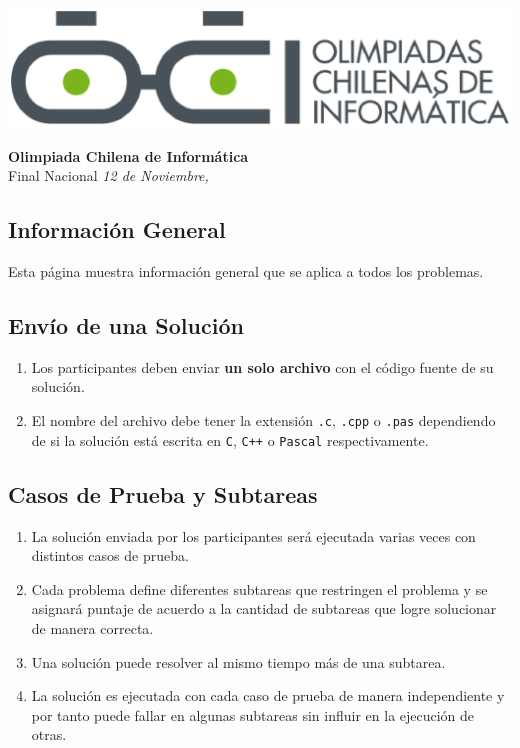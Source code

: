 \documentclass[12pt]{oci}
\begin{document}
\begin{titlingpage}
  \begin{center}
  \includegraphics[scale=0.6]{logo.eps}

  \vskip 70pt
  \Large{\bf Olimpiada Chilena de Inform\'atica\\ \the\year}
  \vskip 10pt
  \large{Final Nacional}
  \vskip 10pt
  \normalsize{\it 12 de Noviembre, \the\year}


  \vskip 95pt

  \end{center}
\end{titlingpage}


\subsection*{Informaci\'on General}

Esta p\'agina muestra informaci\'on general que se aplica a todos los problemas.

\subsection*{Env\'io de una Soluci\'on}


\begin{enumerate}
\itemsep 0em
\item Los participantes deben enviar {\bf un solo archivo} con el c\'odigo fuente de su soluci\'on.
\item El nombre del archivo debe tener la extensi\'on \verb+.c+, \verb+.cpp+ o \verb+.pas+ dependiendo de si la soluci\'on est\'a escrita en \verb|C|, \verb|C++| o \verb|Pascal| respectivamente.
\end{enumerate}

\subsection*{Casos de Prueba y Subtareas}
\begin{enumerate}
\itemsep 0em
\item La soluci\'on enviada por los participantes ser\'a ejecutada varias veces con distintos casos de prueba.
\item Cada problema define diferentes subtareas que restringen el problema y se asignar\'a puntaje de acuerdo a la cantidad de subtareas que logre solucionar de manera correcta.
\item Una soluci\'on puede resolver al mismo tiempo m\'as de una subtarea.
\item La soluci\'on es ejecutada con cada caso de prueba de manera independiente y por tanto puede fallar en algunas subtareas sin influir en la ejecuci\'on de otras.
\end{enumerate}
\end{document}
